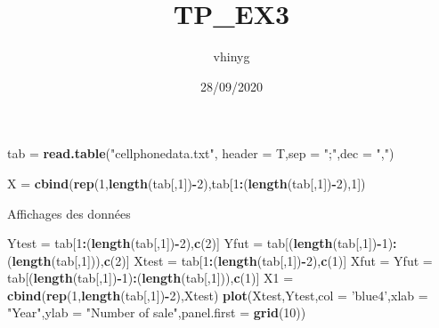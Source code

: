 \documentclass[
]{article}
\title{TP\_EX3}
\author{vhinyg}
\date{28/09/2020}
\newenvironment{Shaded}{\begin{snugshade}}{\end{snugshade}}
\newcommand{\DataTypeTok}[1]{\textcolor[rgb]{0.13,0.29,0.53}{#1}}
\newcommand{\DecValTok}[1]{\textcolor[rgb]{0.00,0.00,0.81}{#1}}
\newcommand{\KeywordTok}[1]{\textcolor[rgb]{0.13,0.29,0.53}{\textbf{#1}}}
\newcommand{\NormalTok}[1]{#1}
\newcommand{\OperatorTok}[1]{\textcolor[rgb]{0.81,0.36,0.00}{\textbf{#1}}}
\newcommand{\StringTok}[1]{\textcolor[rgb]{0.31,0.60,0.02}{#1}}
\begin{document}
\maketitle

\begin{Shaded}
\begin{Highlighting}[]
\NormalTok{tab =}\StringTok{ }\KeywordTok{read.table}\NormalTok{(}\StringTok{"cellphonedata.txt"}\NormalTok{, }\DataTypeTok{header =}\NormalTok{ T,}\DataTypeTok{sep =} \StringTok{";"}\NormalTok{,}\DataTypeTok{dec =} \StringTok{","}\NormalTok{)}

\NormalTok{X =}\StringTok{ }\KeywordTok{cbind}\NormalTok{(}\KeywordTok{rep}\NormalTok{(}\DecValTok{1}\NormalTok{,}\KeywordTok{length}\NormalTok{(tab[,}\DecValTok{1}\NormalTok{])}\OperatorTok{-}\DecValTok{2}\NormalTok{),tab[}\DecValTok{1}\OperatorTok{:}\NormalTok{(}\KeywordTok{length}\NormalTok{(tab[,}\DecValTok{1}\NormalTok{])}\OperatorTok{-}\DecValTok{2}\NormalTok{),}\DecValTok{1}\NormalTok{]) }
\end{Highlighting}
\end{Shaded}

Affichages des données

\begin{Shaded}
\begin{Highlighting}[]
\NormalTok{Ytest =}\StringTok{ }\NormalTok{tab[}\DecValTok{1}\OperatorTok{:}\NormalTok{(}\KeywordTok{length}\NormalTok{(tab[,}\DecValTok{1}\NormalTok{])}\OperatorTok{-}\DecValTok{2}\NormalTok{),}\KeywordTok{c}\NormalTok{(}\DecValTok{2}\NormalTok{)]}
\NormalTok{Yfut =}\StringTok{ }\NormalTok{tab[(}\KeywordTok{length}\NormalTok{(tab[,}\DecValTok{1}\NormalTok{])}\OperatorTok{-}\DecValTok{1}\NormalTok{)}\OperatorTok{:}\NormalTok{(}\KeywordTok{length}\NormalTok{(tab[,}\DecValTok{1}\NormalTok{])),}\KeywordTok{c}\NormalTok{(}\DecValTok{2}\NormalTok{)]}
\NormalTok{Xtest =}\StringTok{ }\NormalTok{tab[}\DecValTok{1}\OperatorTok{:}\NormalTok{(}\KeywordTok{length}\NormalTok{(tab[,}\DecValTok{1}\NormalTok{])}\OperatorTok{-}\DecValTok{2}\NormalTok{),}\KeywordTok{c}\NormalTok{(}\DecValTok{1}\NormalTok{)]}
\NormalTok{Xfut =}\StringTok{ }\NormalTok{Yfut =}\StringTok{ }\NormalTok{tab[(}\KeywordTok{length}\NormalTok{(tab[,}\DecValTok{1}\NormalTok{])}\OperatorTok{-}\DecValTok{1}\NormalTok{)}\OperatorTok{:}\NormalTok{(}\KeywordTok{length}\NormalTok{(tab[,}\DecValTok{1}\NormalTok{])),}\KeywordTok{c}\NormalTok{(}\DecValTok{1}\NormalTok{)]}
\NormalTok{X1 =}\StringTok{ }\KeywordTok{cbind}\NormalTok{(}\KeywordTok{rep}\NormalTok{(}\DecValTok{1}\NormalTok{,}\KeywordTok{length}\NormalTok{(tab[,}\DecValTok{1}\NormalTok{])}\OperatorTok{-}\DecValTok{2}\NormalTok{),Xtest)}
\KeywordTok{plot}\NormalTok{(Xtest,Ytest,}\DataTypeTok{col =} \StringTok{'blue4'}\NormalTok{,}\DataTypeTok{xlab =} \StringTok{"Year"}\NormalTok{,}\DataTypeTok{ylab =} \StringTok{"Number of sale"}\NormalTok{,}\DataTypeTok{panel.first =} \KeywordTok{grid}\NormalTok{(}\DecValTok{10}\NormalTok{))}
\end{Highlighting}
\end{Shaded}
\end{document}
